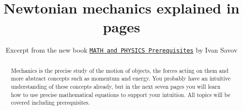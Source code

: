 \documentclass[letterpaper,9pt,journal]{IEEEtran}
\title{ \Huge Newtonian mechanics explained in \fourrr pages}
\author{Excerpt from the new book \href{http://minireference.com/contents}{\texttt{MATH and PHYSICS Prerequisites}} by Ivan Savov}
\date{}
\def\fourrr{seven }
\begin{document}
\maketitle


%

  

\begin{abstract}
Mechanics is the precise study of the motion of objects, the forces acting
on them and more abstract concepts such as momentum and energy.
You probably have an intuitive understanding of these concepts already,
but in the next \fourrr pages you will learn how to use precise mathematical
equations to support your intuition. All topics will be covered including prerequisites.
\end{abstract}



%

%
\end{document}
